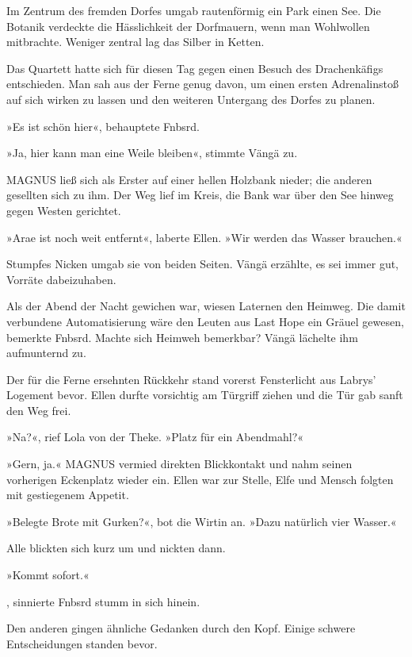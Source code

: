 Im Zentrum des fremden Dorfes umgab rautenförmig ein Park einen See. Die Botanik verdeckte die Hässlichkeit der Dorfmauern, wenn man Wohlwollen mitbrachte. Weniger zentral lag das Silber in Ketten.

Das Quartett hatte sich für diesen Tag gegen einen Besuch des Drachenkäfigs entschieden. Man sah aus der Ferne genug davon, um einen ersten Adrenalinstoß auf sich wirken zu lassen und den weiteren Untergang des Dorfes zu planen.

»Es ist schön hier«, behauptete Fnbsrd.

»Ja, hier kann man eine Weile bleiben«, stimmte Vängä zu. 

MAGNUS ließ sich als Erster auf einer hellen Holzbank nieder; die anderen gesellten sich zu ihm. Der Weg lief im Kreis, die Bank war über den See hinweg gegen Westen gerichtet.

»Arae ist noch weit entfernt«, laberte Ellen. »Wir werden das Wasser brauchen.«

Stumpfes Nicken umgab sie von beiden Seiten. Vängä erzählte, es sei immer gut, Vorräte dabeizuhaben.

Als der Abend der Nacht gewichen war, wiesen Laternen den Heimweg. Die damit verbundene Automatisierung wäre den Leuten aus Last Hope ein Gräuel gewesen, bemerkte Fnbsrd. Machte sich Heimweh bemerkbar? Vängä lächelte ihm aufmunternd zu.

Der für die Ferne ersehnten Rückkehr stand vorerst Fensterlicht aus Labrys’ Logement bevor. Ellen durfte vorsichtig am Türgriff ziehen und die Tür gab sanft den Weg frei.

»Na?«, rief Lola von der Theke. »Platz für ein Abendmahl?«

 »Gern, ja.« MAGNUS vermied direkten Blickkontakt und nahm seinen vorherigen Eckenplatz wieder ein. Ellen war zur Stelle, Elfe und Mensch folgten mit gestiegenem Appetit.

»Belegte Brote mit Gurken?«, bot die Wirtin an. »Dazu natürlich vier Wasser.«

Alle blickten sich kurz um und nickten dann.

»Kommt sofort.«

, sinnierte Fnbsrd stumm in sich hinein. 

Den anderen gingen ähnliche Gedanken durch den Kopf. Einige schwere Entscheidungen standen bevor.

